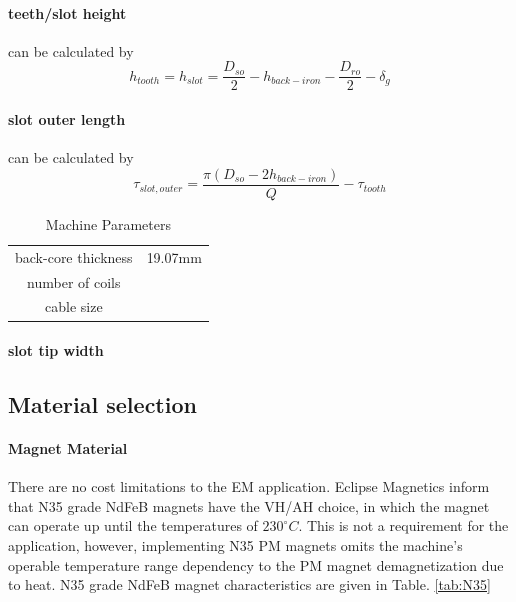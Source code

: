 \documentclass [a4 paper, 11pt, titlepage] {article}
\begin{document}
	\paragraph{teeth/slot height} can be calculated by
	\begin{equation}
		h_{tooth}=h_{slot}=\frac{D_{so}}{2}-h_{back-iron}-\frac{D_{ro}}{2}-\delta_g
	\end{equation}
	
	\paragraph{slot outer length} can be calculated by
	\begin{equation}
		\tau_{slot,outer}=\frac{\pi (D_{so}-2h_{back-iron})}{Q}-\tau_{tooth}
	\end{equation}
	
		\begin{table}[h]
		\begin{center}
			\begin{tabular}{c|c}
				 &  \\
				\hline
				back-core thickness & 19.07mm \\
				number of coils & \\
				cable size & 
			\end{tabular}
		\end{center}
		\caption{Machine Parameters}
		\label{tab:machineParameters}
	\end{table}
	
	\paragraph{slot tip width}
	
	
	
	
	
	
	
	\subsection{Material selection}
	
	\paragraph{Magnet Material} There are no cost limitations to the EM application. Eclipse Magnetics inform that N35 grade NdFeB magnets have the VH/AH choice, in which the magnet can operate up until the temperatures of $230^{\circ}C$. This is not a requirement for the application, however, implementing N35 PM magnets omits the machine's operable temperature range dependency to the PM magnet demagnetization due to heat.
	N35 grade NdFeB magnet characteristics are given in Table. \ref{tab:N35}
	
\end{document}
